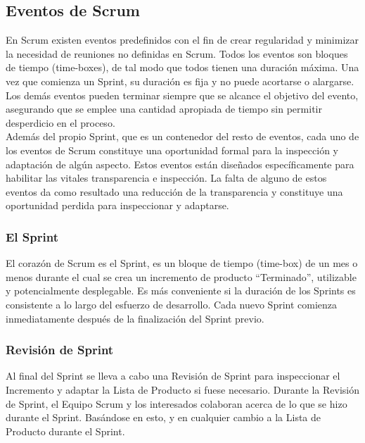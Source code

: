   \subsection{Eventos de Scrum}
  En Scrum existen eventos predefinidos con el fin de crear regularidad y minimizar la necesidad de reuniones no definidas en Scrum. Todos los eventos son bloques de tiempo (time-boxes), de tal modo que todos tienen una duración máxima. Una vez que comienza un Sprint, su duración es fija y no puede acortarse o alargarse. Los demás eventos pueden terminar siempre que se alcance el objetivo del evento, asegurando que se emplee una cantidad apropiada de tiempo sin permitir desperdicio en el proceso. \cite{ref2} \\
  
  Además del propio Sprint, que es un contenedor del resto de eventos, cada uno de los eventos de Scrum constituye una oportunidad formal para la inspección y adaptación de algún aspecto. Estos eventos están diseñados específicamente para habilitar las vitales transparencia e inspección. La falta de alguno de estos eventos da como resultado una reducción de la transparencia y constituye una oportunidad perdida para inspeccionar y adaptarse.
  
  \subsubsection{El Sprint}
  El corazón de Scrum es el Sprint, es un bloque de tiempo (time-box) de un mes o menos durante el cual se crea un incremento de producto “Terminado”, utilizable y potencialmente desplegable. Es más conveniente si la duración de los Sprints es consistente a lo largo del esfuerzo de desarrollo. Cada nuevo Sprint comienza inmediatamente después de la finalización del Sprint previo.
  
  \subsubsection{Revisión de Sprint}
  Al final del Sprint se lleva a cabo una Revisión de Sprint para inspeccionar el Incremento y adaptar la Lista de Producto si fuese necesario. Durante la Revisión de Sprint, el Equipo Scrum y los interesados colaboran acerca de lo que se hizo durante el Sprint. Basándose en esto, y en cualquier cambio a la Lista de Producto durante el Sprint.
  
